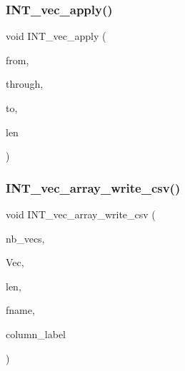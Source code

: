 \subsubsection{\texorpdfstring{I\+N\+T\+\_\+vec\+\_\+apply()}{INT\_vec\_apply()}}
{\footnotesize\ttfamily void I\+N\+T\+\_\+vec\+\_\+apply (\begin{DoxyParamCaption}\item[{\mbox{\hyperlink{galois_8h_a09fddde158a3a20bd2dcadb609de11dc}{I\+NT}} $\ast$}]{from,  }\item[{\mbox{\hyperlink{galois_8h_a09fddde158a3a20bd2dcadb609de11dc}{I\+NT}} $\ast$}]{through,  }\item[{\mbox{\hyperlink{galois_8h_a09fddde158a3a20bd2dcadb609de11dc}{I\+NT}} $\ast$}]{to,  }\item[{\mbox{\hyperlink{galois_8h_a09fddde158a3a20bd2dcadb609de11dc}{I\+NT}}}]{len }\end{DoxyParamCaption})}

\mbox{\label{util_8_c_a803b2b8fcb0a06e4b983a40a7d0c2232}} 
\subsubsection{\texorpdfstring{I\+N\+T\+\_\+vec\+\_\+array\+\_\+write\+\_\+csv()}{INT\_vec\_array\_write\_csv()}}
{\footnotesize\ttfamily void I\+N\+T\+\_\+vec\+\_\+array\+\_\+write\+\_\+csv (\begin{DoxyParamCaption}\item[{\mbox{\hyperlink{galois_8h_a09fddde158a3a20bd2dcadb609de11dc}{I\+NT}}}]{nb\+\_\+vecs,  }\item[{\mbox{\hyperlink{galois_8h_a09fddde158a3a20bd2dcadb609de11dc}{I\+NT}} $\ast$$\ast$}]{Vec,  }\item[{\mbox{\hyperlink{galois_8h_a09fddde158a3a20bd2dcadb609de11dc}{I\+NT}}}]{len,  }\item[{const \mbox{\hyperlink{galois_8h_ab6cc7b4aeb6ea31aba2b3fbfc83ff5e6}{B\+Y\+TE}} $\ast$}]{fname,  }\item[{const \mbox{\hyperlink{galois_8h_ab6cc7b4aeb6ea31aba2b3fbfc83ff5e6}{B\+Y\+TE}} $\ast$$\ast$}]{column\+\_\+label }\end{DoxyParamCaption})}

\mbox{\label{util_8_c_a2a0a724647575fcd3090c763985eb81a}} 
